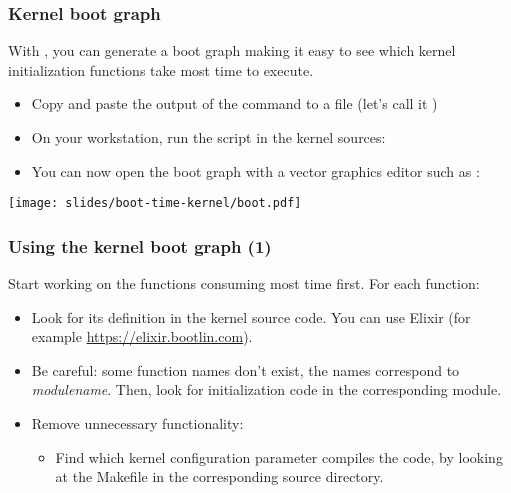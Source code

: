 \begin{frame}
\frametitle{Kernel boot graph}
With , you can generate a boot graph
making it easy to see which kernel initialization functions
take most time to execute.
\begin{itemize}
\item Copy and paste the output of
      the  command to a file (let's call it )
\item On your workstation, run the  script
      in the kernel sources: \\
\item You can now open the boot graph with a vector graphics
      editor such as :
\end{itemize}
\begin{center}
    \texttt{[image: slides/boot-time-kernel/boot.pdf]}
\end{center}
\end{frame}

\begin{frame}
\frametitle{Using the kernel boot graph (1)}
Start working on the functions consuming most time first. For each
function:
\begin{itemize}
\item Look for its definition in the kernel source code. You can use
      Elixir (for example \url{https://elixir.bootlin.com}).
\item Be careful: some function names don't exist, the names
      correspond to {\em modulename}. Then, look for
      initialization code in the corresponding module.
\item Remove unnecessary functionality:
      \begin{itemize}
      \item Find which kernel configuration parameter
      compiles the code, by looking at the Makefile in the corresponding
      source directory.
      \end{itemize}
\end{itemize}
\end{frame}

